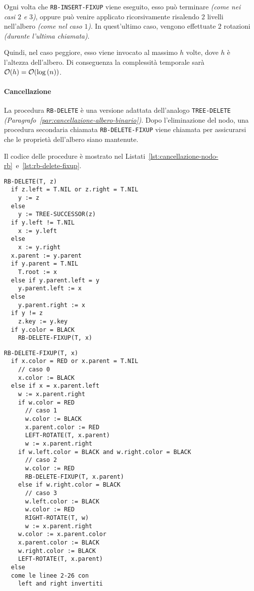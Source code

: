 \documentclass[italian, 10pt]{article}
\begin{document}
\bigskip
Ogni volta che \texttt{RB-INSERT-FIXUP} viene eseguito, esso può terminare \textit{(come nei casi \(2\) e \(3\))}, oppure può venire applicato ricorsivamente risalendo \(2\) livelli nell'albero \textit{(come nel caso \(1\))}.
In quest'ultimo caso, vengono effettuate \(2\) rotazioni \textit{(durante l'ultima chiamata)}.

Quindi, nel caso peggiore, esso viene invocato al massimo \(h\) volte, dove \(h\) è l'altezza dell'albero.
Di conseguenza la complessità temporale sarà \(\mathcal{O}(h) = \mathcal{O}(\log{(n)})\).

\paragraph{Cancellazione}
\label{par:cancellazione-rb}

La procedura \texttt{RB-DELETE} è una versione adattata dell'analogo \texttt{TREE-DELETE} \textit{(Paragrafo~\ref{par:cancellazione-albero-binario})}.
Dopo l'eliminazione del nodo, una procedura secondaria chiamata \texttt{RB-DELETE-FIXUP} viene chiamata per assicurarsi che le proprietà dell'albero \RB siano mantenute.

Il codice delle procedure è mostrato nel Listati~\ref{lst:cancellazione-nodo-rb}~e~\ref{lst:rb-delete-fixup}.

\begin{lstlisting}[style=pseudocode, caption={Cancellazione in un RB}, label={lst:cancellazione-nodo-rb}]
RB-DELETE(T, z)
  if z.left = T.NIL or z.right = T.NIL
    y := z
  else
    y := TREE-SUCCESSOR(z)
  if y.left != T.NIL
    x := y.left
  else
    x := y.right
  x.parent := y.parent
  if y.parent = T.NIL
    T.root := x
  else if y.parent.left = y
    y.parent.left := x
  else
    y.parent.right := x
  if y != z
    z.key := y.key
  if y.color = BLACK
    RB-DELETE-FIXUP(T, x)
\end{lstlisting}
\begin{lstlisting}[style=pseudocode, caption={Fixup dopo cancellazione}, label={lst:rb-delete-fixup}]
RB-DELETE-FIXUP(T, x)
  if x.color = RED or x.parent = T.NIL
    // caso 0
    x.color := BLACK
  else if x = x.parent.left
    w := x.parent.right
    if w.color = RED
      // caso 1
      w.color := BLACK
      x.parent.color := RED
      LEFT-ROTATE(T, x.parent)
      w := x.parent.right
    if w.left.color = BLACK and w.right.color = BLACK
      // caso 2
      w.color := RED
      RB-DELETE-FIXUP(T, x.parent)
    else if w.right.color = BLACK
      // caso 3
      w.left.color := BLACK
      w.color := RED
      RIGHT-ROTATE(T, w)
      w := x.parent.right
    w.color := x.parent.color
    x.parent.color := BLACK
    w.right.color := BLACK
    LEFT-ROTATE(T, x.parent)
  else
  come le linee 2-26 con
    left and right invertiti
  \end{lstlisting}
\end{document}
